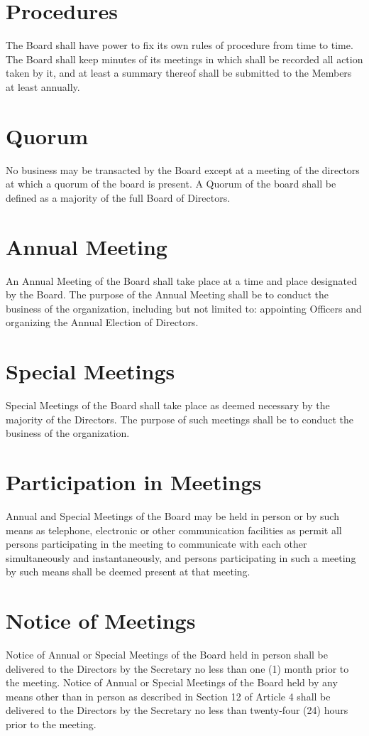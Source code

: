 \documentclass[10pt, english]{bylaws}
\begin{document}
\section{Procedures}
The Board shall have power to fix its own rules of procedure from time to time.
The Board shall keep minutes of its meetings in which shall be recorded all
action taken by it, and at least a summary thereof shall be submitted to the
Members at least annually.

\section{Quorum}
No business may be transacted by the Board except at a meeting of the directors
at which a quorum of the board is present. A Quorum of the board shall be
defined as a majority of the full Board of Directors.

\section{Annual Meeting}
An Annual Meeting of the Board shall take place at a time and place designated
by the Board.  The purpose of the Annual Meeting shall be to conduct the
business of the organization, including but not limited to: appointing Officers
and organizing the Annual Election of Directors.

\section{Special Meetings}
Special Meetings of the Board shall take place as deemed necessary by the
majority of the Directors.  The purpose of such meetings shall be to conduct
the business of the organization.

\section{Participation in Meetings}
Annual and Special Meetings of the Board may be held in person or by such means
as telephone, electronic or other communication facilities as permit all persons
participating in the meeting to communicate with each other simultaneously and
instantaneously, and persons participating in such a meeting by such means shall
be deemed present at that meeting.

\section{Notice of Meetings}
Notice of Annual or Special Meetings of the Board held in person shall be
delivered to the Directors by the Secretary no less than one (1) month prior to
the meeting.  Notice of Annual or Special Meetings of the Board held by any
means other than in person as described in Section 12 of Article 4 shall be
delivered to the Directors by the Secretary no less than twenty-four (24) hours
prior to the meeting.
\end{document}
